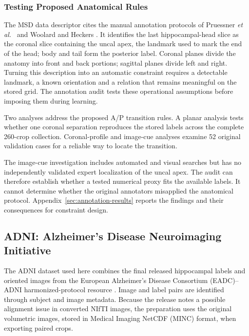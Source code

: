 \subsubsection{Testing Proposed Anatomical Rules}
\label{sec:annotation-compatibility}

The MSD data descriptor \cite{simpson2019dataset} cites the manual
annotation protocols of Pruessner \emph{et al.}\
\cite{pruessner2000volumetry} and Woolard and Heckers
\cite{woolard2012asymmetry}. It identifies the last hippocampal-head slice
as the coronal slice containing the uncal apex, the landmark used to mark
the end of the head; body and tail form the posterior label. Coronal planes
divide the anatomy into front and back portions; sagittal planes divide left
and right. Turning this description into an automatic constraint requires a
detectable landmark, a known orientation and a relation that remains
meaningful on the stored grid. The annotation audit tests these operational
assumptions before imposing them during learning.

Two analyses address the proposed A/P transition rules. A planar analysis tests
whether one coronal separation reproduces the stored labels across the
complete 260-crop collection. Coronal-profile and image-cue analyses examine 52 original
validation cases for a reliable way to locate the transition.

The image-cue investigation includes automated and visual searches but
has no independently validated expert localization of the uncal apex.
The audit can therefore establish whether a tested numerical proxy fits
the available labels. It cannot determine whether the original annotators
misapplied the anatomical protocol. Appendix~\ref{sec:annotation-results}
reports the findings and their consequences for constraint design.


\subsection{ADNI: Alzheimer's Disease Neuroimaging Initiative}
\label{sec:adni-methods}

The ADNI dataset used here combines the final released hippocampal labels
and oriented images from the European Alzheimer's Disease Consortium
(EADC)--ADNI harmonized-protocol resource \cite{harpReleasedLabels}. Image
and label pairs are identified through subject and image metadata. Because
the release notes a possible alignment issue in converted NIfTI images, the
preparation uses the original volumetric images, stored in Medical
Imaging NetCDF (MINC) format, when exporting paired crops.

